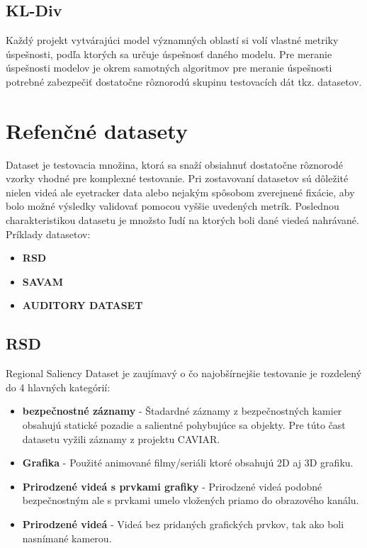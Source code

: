 \subsection{KL-Div}

Každý projekt vytvárajúci model významných oblastí si volí vlastné metriky úspešnosti, podľa ktorých sa určuje úspešnosť daného modelu. Pre meranie úspešnosti modelov je okrem samotných algoritmov pre meranie úspešnosti potrebné zabezpečiť dostatočne rôznorodú skupinu testovacích dát tkz. datasetov.

\section{Refenčné datasety}
Dataset je testovacia množina, ktorá sa snaží obsiahnuť dostatočne rôznorodé vzorky vhodné pre komplexné testovanie. Pri zostavovaní datasetov sú dôležité nielen videá ale eyetracker data alebo nejakým spôsobom zverejnené fixácie, aby bolo možné výsledky validovať pomocou vyššie uvedených metrík. Poslednou charakteristikou datasetu je množsto ľudí na ktorých boli dané viedeá nahrávané. \\ Príklady datasetov:
\begin{itemize}
	\item \textbf{RSD}\cite{rsd}
	\item \textbf{SAVAM}\cite{savam}
	\item \textbf{AUDITORY DATASET}\cite{courot-dataset}
\end{itemize}

\subsection{RSD}
Regional Saliency Dataset je zaujímavý o čo najobšírnejšie testovanie je rozdelený do 4 hlavných kategórií: \\
\begin{itemize}
	\item \textbf{bezpečnostné záznamy} - Štadardné záznamy z bezpečnostných kamier obsahujú statické pozadie a salientné pohybujúce sa objekty. Pre túto čast datasetu vyžili záznamy z projektu CAVIAR\cite{rsd-caviar}.
	\item \textbf{Grafika} - Použité animované filmy/seriáli ktoré obsahujú 2D aj 3D grafiku.
  \item \textbf{Prirodzené videá s prvkami grafiky} - Prirodzené videá  podobné bezpečnostným ale s prvkami umelo vložených priamo do obrazového kanálu.
  \item \textbf{Prirodzené videá} - Videá bez pridaných grafických prvkov, tak ako boli nasnímané kamerou.
\end{itemize}

